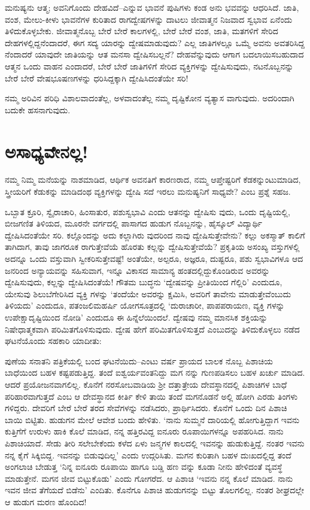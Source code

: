 ಮನುಷ್ಯನು ಆತ್ಮ; ಅವನಿಗೊಂದು ದೇಹವಿದೆ–ಎನ್ನುವ ಭಾವನೆ ಪುಷಿಗಳು ಕಂಡ ಅನು ಭವವನ್ನು ಆಧರಿಸಿದೆ. ಜಾತಿ, ವಂಶ, ಮೇಲು-ಕೀಳು ಭಾವನೆಗಳ ಕುರಿತಾದ ರಾಗದ್ವೇಷಗಳನ್ನು ದಾಟಲು ಜೀವಾತ್ಮನ ನಿಜವಾದ ಸ್ವಭಾವ ಏನೆಂದು ತಿಳಿದುಕೊಳ್ಳಬೇಕು. ಜೀವಾತ್ಮನೊಬ್ಬ ಬೇರೆ ಬೇರೆ ಕಾಲಗಳಲ್ಲಿ, ಬೇರೆ ಬೇರೆ ವಂಶ, ಜಾತಿ, ಮತಗಳಿಗೆ ಸೇರಿದ ದೇಹಗಳಲ್ಲಿದ್ದನೆಂದಾದರೆ, ಈಗ ಸದ್ಯ ಯಾರನ್ನು ದ್ವೇಷಮಾಡುವುದು? ಎಲ್ಲ ಜಾತಿಗಳಲ್ಲೂ ಒಮ್ಮೆ ಅವನು ಅವತರಿಸಿದ್ದ ನೆಂದಾದರೆ ಯಾವುದೇ ಜಾತಿಯನ್ನು ಆತ ಮನಸಾ ದ್ವೇಷಿಸಬಲ್ಲನೆ? ದೇಹವೆನ್ನುವುದು ಆಗಾಗ ಬದಲಾಯಿಸಬಹುದಾದ ಆತ್ಮನ ಒಂದು ವಾಹನ ಎಂದಾದರೆ, ಬೇರೆ ಬೇರೆ ಜಾತಿಗಳಿಗೆ ಸೇರಿದ ವ್ಯಕ್ತಿಗಳನ್ನು ದ್ವೇಷಿಸುವುದು, ನಟನೊಬ್ಬನನ್ನು ಬೇರೆ ಬೇರೆ ವೇಷಭೂಷಣಗಳನ್ನು ಧರಿಸಿದ್ದಕ್ಕಾಗಿ ದ್ವೇಷಿಸಿದಂತೆಯೇ ಸರಿ!

ನಮ್ಮ ಅರಿವಿನ ಪರಿಧಿ ವಿಶಾಲವಾದಂತೆಲ್ಲ, ಅಳವಾದಂತೆಲ್ಲ ನಮ್ಮ ದೃಷ್ಟಿಕೋನ ವ್ಯತ್ಯಾಸ ವಾಗುವುದು. ಅದರಿಂದಾಗಿ ಬದುಕೇ ಹಸನಾಗುವುದು.


\section{ಅಸಾಧ್ಯವೇನಲ್ಲ!}

ನಮ್ಮ ನಿಮ್ಮ ಮನೆಯನ್ನು ನಾಶಮಾಡಿದ, ಆರ್ಥಿಕ ಅವನತಿಗೆ ಕಾರಣರಾದ, ನಮ್ಮ ಆಪ್ತೇಷ್ಟರಿಗೆ ಕೆಡಕನ್ನುಂಟುಮಾಡಿದ, ಸ್ತ್ರೀಯರಿಗೆ ಕೆಡುಕನ್ನು ಮಾಡಿದಂಥ ವ್ಯಕ್ತಿಗಳನ್ನು ದ್ವೇಷಿ ಸದೆ ಇರಲು ಮನುಷ್ಯನಿಗೆ ಸಾಧ್ಯವೇ? ಎಂಬ ಪ್ರಶ್ನೆ ಸಹಜ.

ಒಬ್ಬಾತ ಕ್ರೂರಿ, ಸ್ವೈರಾಚಾರಿ, ಹಿಂಸಾತುರ, ಪಶುಸ್ವಭಾವಿ ಎಂದು ಆತನನ್ನು ದ್ವೇಷಿಸು ವುದು, ಒಂದು ದೃಷ್ಟಿಯಲ್ಲಿ, ಬೀಜಗಣಿತ ತಿಳಿಯದ, ಮೂರನೇ ವರ್ಗದಲ್ಲಿ ಪಾಸಾಗದ ಹುಡುಗ ನೊಬ್ಬನನ್ನು, ಹೈಸ್ಕೂಲ್ ವಿದ್ಯಾರ್ಥಿ ದ್ವೇಷಿಸಿದಂತೆಯೇ ಸರಿ. ಕಲ್ಲೊಂದನ್ನು ಅದು ಕಲ್ಲಾಗಿರು ವುದರಿಂದ ನಾವು ದ್ವೇಷಿಸುತ್ತೇವೇನು? ಕಲ್ಲು ಅಕಸ್ಮಾತ್ ಕಾಲಿಗೆ ತಾಗಿದಾಗ, ತಾವು ಜಾಗರೂಕ ರಾಗುತ್ತೇವೆಯೆ ಹೊರತು ಕಲ್ಲನ್ನು ದ್ವೇಷಿಸುತ್ತೇವೆಯೆ? ಪ್ರಕೃತಿಯ ಅಸಂಖ್ಯ ವಸ್ತುಗಳಲ್ಲಿ ಅದನ್ನೂ ಒಂದು ವಸ್ತುವಾಗಿ ಸ್ವೀಕರಿಸುತ್ತೇವಷ್ಟೆ! ಅಂತೆಯೇ, ಅಲ್ಪರೂ, ಅಜ್ಞರೂ, ದುಷ್ಟರೂ, ಪಶು ಸ್ವಭಾವಿಗಳೂ ಆದ ಜನರಿಂದ ಅನ್ಯಾಯವನ್ನು ಸಹಿಸುವಾಗ, ಇನ್ನೂ ವಿಕಾಸದ ಸಾಮಾನ್ಯ ಹಂತದಲ್ಲಿದ್ದುಕೊಂಡಿರುವ ಅವರನ್ನು ದ್ವೇಷಿಸುವುದು, ಕಲ್ಲನ್ನು ದ್ವೇಷಿಸಿದಂತೆಯೆ! ಗೌತಮ ಬುದ್ಧನು ‘ದ್ವೇಷವನ್ನು ಪ್ರೀತಿಯಿಂದ ಗೆಲ್ಲಿರಿ’ ಎಂದುದೂ, ಯೇಸುವು ಶಿಲುಬೆಗೇರಿಸಿದ ವ್ಯಕ್ತಿ ಗಳನ್ನು ‘ತಂದೆಯೇ ಅವರನ್ನು ಕ್ಷಮಿಸಿ, ಅವರಿಗೆ ತಾವೇನು ಮಾಡುತ್ತೇವೆಂಬುದು ತಿಳಿಯದು’ ಎಂದುದೂ, ಪತಂಜಲಿಮಹರ್ಷಿ ಯೋಗಸೂತ್ರದಲ್ಲಿ ‘ದುರಾಚಾರೀ, ಪಾಪಪರಾಯಣ, ವ್ಯಕ್ತಿ ಗಳನ್ನು ಉಪೇಕ್ಷಾದೃಷ್ಟಿಯಿಂದ ನೋಡಿ’ ಎಂದುದೂ ಈ ಹಿನ್ನೆಲೆಯಿಂದಲೆ. ದ್ವೇಷವು ನಮ್ಮ ಮಾನಸಿಕ ಶಕ್ತಿಯನ್ನು ನಿಷೇಧಾತ್ಮಕವಾಗಿ ಪರಿಮಿತಗೊಳಿಸುವುದು. ದ್ವೇಷ ಹೇಗೆ ಪರಿಮಿತಗೊಳಿಸುತ್ತದೆ ಎಂಬುದನ್ನು ತಿಳಿದುಕೊಳ್ಳಲು ನಡೆದ ಘಟನೆಯೊಂದು ಸಹಕಾರಿ ಯಾದೀತು:

ಪುಣೆಯ ಸನಾತನಿ ಪತ್ರಿಕೆಯಲ್ಲಿ ಬಂದ ಘಟನೆಯಿದು–ಎಂಟು ವರ್ಷ ಪ್ರಾಯದ ಬಾಲಕ ನೊಬ್ಬ ಪಿಶಾಚಿಯ ಬಾಧೆಯಿಂದ ಬಹಳ ಕಷ್ಟಪಡುತ್ತಿದ್ದ. ತಂದೆ ಐಶ್ವರ್ಯವಂತನಿದ್ದು ಮಗ ನನ್ನು ಗುಣಪಡಿಸಲು ಬಹಳ ಖರ್ಚು ಮಾಡಿದ. ಆದರೆ ಪ್ರಯೋಜನವಾಗಲಿಲ್ಲ. ಕೊನೆಗೆ ನರಸೋಬವಾಡಿಯ ಶ‍್ರೀ ದತ್ತಾತ್ರೇಯ ದೇವಸ್ಥಾನದಲ್ಲಿ ಪಿಶಾಚಿಗಳ ಬಾಧೆ ಪರಿಹಾರವಾಗುತ್ತದೆ ಎಂಬ ಆ ದೇವಸ್ಥಾನದ ಕೀರ್ತಿ ಕೇಳಿ ತಾಯಿ ತಂದೆ ಮಗನೊಡನೆ ಅಲ್ಲಿ ಹೋಗಿ ಎರಡು ತಿಂಗಳು ಗಳಿದ್ದರು. ದೇವರಿಗೆ ಬೇರೆ ಬೇರೆ ತರದ ಸೇವೆಗಳನ್ನು ನಡೆಸಿದರು, ಪ್ರಾರ್ಥಿಸಿದರು. ಕೊನೆಗೆ ಒಂದು ದಿನ ಪಿಶಾಚಿ ಬಾಯಿ ಬಿಟ್ಟಿತು. ಹುಡುಗನ ಮೇಲೆ ಆವೇಶ ಬಂದು ಹೇಳಿತು. ‘ನಾನು ಸುಮ್ಮನೆ ದಾರಿಯಲ್ಲಿ ಹೋಗುತ್ತಿದ್ದಾಗ ಇವನು ಕುತ್ತಿಗೆಗೆ ಉರುಳು ಹಾಕಿ ಕೊಲೆ ಮಾಡಿದ, ನನ್ನ ಹತ್ತಿರವಿದ್ದ ಐನೂರು ರೂಪಾಯಿಗಳನ್ನೂ ಅಪಹರಿಸಿದ. ನಾನು ಪಿಶಾಚಿಯಾದೆ. ಸೇಡು ತೀರಿ ಸಲೇಬೇಕೆಂದು ಕಳೆದ ಏಳು ಜನ್ಮಗಳ ಕಾಲದಲ್ಲಿ ಇವನನ್ನು ಹುಡುಕುತ್ತಿದ್ದೆ. ನಂತರ ಇವನು ನನ್ನ ಕೈಗೆ ಸಿಕ್ಕಿಬಿದ್ದ. ಇವನನ್ನು ಬಿಡುವುದಿಲ್ಲ’ ಎಂದು ಉದ್ಗರಿಸಿತು. ಮಗನ ಕುರಿತಾಗಿ ಬಹಳ ದುಃಖದಲ್ಲಿದ್ದ ತಂದೆ ಅಂಗಲಾಚಿ ಬೇಡುತ್ತ ‘ನಿನ್ನ ಐನೂರು ರೂಪಾಯಿ ಹಾಗೂ ಬಡ್ಡಿ ಹಣ ವನ್ನು ಕೂಡಾ ನೀನು ಹೇಳಿದಂತೆ ವ್ಯವಸ್ಥೆ ಮಾಡುತ್ತೇನೆ. ಮಗನ ಜೀವ ಬಿಟ್ಟುಕೊಡು’ ಎಂದು ಗೋಗರೆದ. ಆ ಪಿಶಾಚಿ ‘ಇವನು ನನ್ನ ಕೊಲೆ ಮಾಡಿದ. ನಾನು ಇವನ ಜೀವ ತೆಗೆಯದೆ ಬಿಡೆನು’ ಎಂದಿತು. ಕೊನೆಗೂ ಪಿಶಾಚಿ ಹುಡುಗನನ್ನು ಬಿಟ್ಟು ತೊಲಗಲಿಲ್ಲ. ನಂತರ ಶೀಘ್ರದಲ್ಲೇ ಆ ಹುಡುಗ ಮರಣ ಹೊಂದಿದ!

